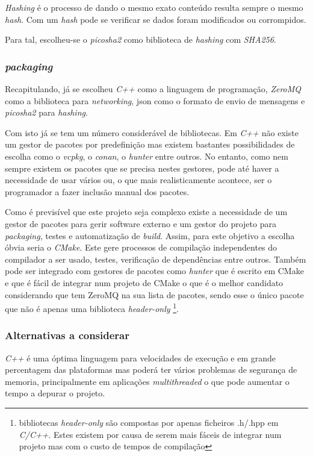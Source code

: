 \textit{Hashing} é o processo de dando o mesmo exato conteúdo resulta sempre o mesmo \textit{hash}. Com um \textit{hash} pode se verificar se dados foram modificados ou corrompidos.

Para tal, escolheu-se o \textit{picosha2} como biblioteca de \textit{hashing} com \textit{SHA256}.

\subsubsection{\textit{packaging}}


Recapitulando, já se escolheu \textit{C++} como a linguagem de programação, \textit{ZeroMQ} como a biblioteca para \textit{networking}, \acrshort{json} como o formato de envio de mensagens e \textit{picosha2} para \textit{hashing}.

Com isto já se tem um número considerável de bibliotecas. Em \textit{C++} não existe um gestor de pacotes por predefinição mas existem bastantes possibilidades de escolha como o \textit{vcpkg}, o \textit{conan}, o \textit{hunter} entre outros. No entanto, como nem sempre existem os pacotes que se precisa nestes gestores, pode até haver a necessidade de usar vários ou, o que mais realisticamente acontece, ser o programador a fazer inclusão manual dos pacotes.

Como é previsível que este projeto seja complexo existe a necessidade de um gestor de pacotes para gerir software externo e um gestor do projeto para \textit{packaging}, testes e automatização de \textit{build}. Assim, para este objetivo a escolha óbvia seria o \textit{CMake}. Este gere processos de compilação independentes do compilador a ser usado, testes, verificação de dependências entre outros. Também pode ser integrado com gestores de pacotes como \textit{hunter} que é escrito em CMake e que é fácil de integrar num projeto de CMake o que é o melhor candidato considerando que tem ZeroMQ na sua lista de pacotes, sendo esse o único pacote que não é apenas uma biblioteca \textit{header-only}
\footnote{bibliotecas \textit{header-only} são compostas por apenas ficheiros .h/.hpp em \textit{C/C++}. Estes existem por causa de serem mais fáceis de integrar num projeto mas com o custo de tempos de compilação}.

\subsubsection{Alternativas a considerar}

\textit{C++} é uma óptima linguagem para velocidades de execução e em grande percentagem das plataformas mas poderá ter vários problemas de segurança de memoria, principalmente em aplicações \textit{multithreaded} o que pode aumentar o tempo a depurar o projeto.

